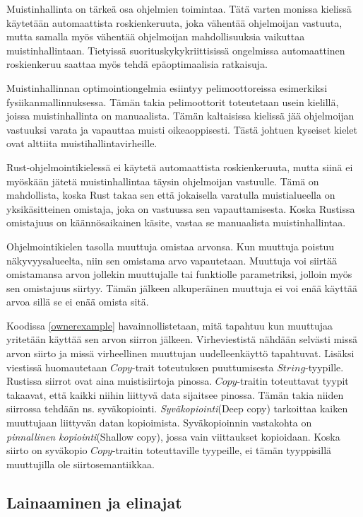 \documentclass[finnish]{tktltiki2}
\theoremstyle{definition}
\theoremstyle{remark}
\begin{document}
Muistinhallinta on tärkeä osa ohjelmien toimintaa. Tätä varten monissa kielissä käytetään automaattista roskienkeruuta, joka vähentää ohjelmoijan vastuuta, mutta samalla myös vähentää ohjelmoijan mahdollisuuksia vaikuttaa muistinhallintaan. Tietyissä suorituskykykriittisissä ongelmissa automaattinen roskienkeruu saattaa myös tehdä epäoptimaalisia ratkaisuja.

Muistinhallinnan optimointiongelmia esiintyy pelimoottoreissa esimerkiksi fysiikanmallinnuksessa. Tämän takia pelimoottorit toteutetaan usein kielillä, joissa muistinhallinta on manuaalista. Tämän kaltaisissa kielissä jää ohjelmoijan vastuuksi varata ja vapauttaa muisti oikeaoppisesti. Tästä johtuen kyseiset kielet ovat alttiita muistihallintavirheille.

Rust-ohjelmointikielessä ei käytetä automaattista roskienkeruuta, mutta siinä ei myöskään jätetä muistinhallintaa täysin ohjelmoijan vastuulle. Tämä on mahdollista, koska Rust takaa sen että jokaisella varatulla muistialueella on yksikäsitteinen omistaja, joka on vastuussa sen vapauttamisesta. Koska Rustissa omistajuus on käännösaikainen käsite, vastaa se manuaalista muistinhallintaa.

Ohjelmointikielen tasolla muuttuja omistaa arvonsa. Kun muuttuja poistuu näkyvyysalueelta, niin sen omistama arvo vapautetaan. Muuttuja voi siirtää omistamansa arvon jollekin muuttujalle tai funktiolle parametriksi, jolloin myös sen omistajuus siirtyy. Tämän jälkeen alkuperäinen muuttuja ei voi enää käyttää arvoa sillä se ei enää omista sitä.

Koodissa \ref{ownerexample} havainnollistetaan, mitä tapahtuu kun muuttujaa yritetään käyttää sen arvon siirron jälkeen. Virheviestistä nähdään selvästi missä arvon siirto ja missä virheellinen muuttujan uudelleenkäyttö tapahtuvat. Lisäksi viestissä huomautetaan $Copy$-trait toteutuksen puuttumisesta $String$-tyypille. Rustissa siirrot ovat aina muistisiirtoja pinossa. $Copy$-traitin toteuttavat tyypit takaavat, että kaikki niihin liittyvä data sijaitsee pinossa. Tämän takia niiden siirrossa tehdään ns. syväkopiointi. \textit{Syväkopiointi}(Deep copy) tarkoittaa kaiken muuttujaan liittyvän datan kopioimista. Syväkopioinnin vastakohta on \textit{pinnallinen kopiointi}(Shallow copy), jossa vain viittaukset kopioidaan. Koska siirto on syväkopio $Copy$-traitin toteuttaville tyypeille, ei tämän tyyppisillä muuttujilla ole siirtosemantiikkaa.

\subsection{Lainaaminen ja elinajat}
\end{document}
